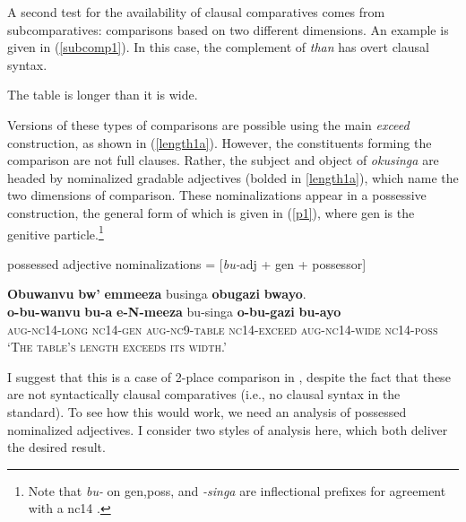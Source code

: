 \documentclass[output=paper,
modfonts
]{langscibook}
\begin{document}
A second test for the availability of clausal comparatives comes from {\sc subcomparatives}: comparisons based on two different dimensions. An  example is given in (\ref{subcomp1}). In this case, the complement of {\it than} has overt clausal syntax.



\begin{exe}
\ex\label{subcomp1} The table is longer than it is wide.
\end{exe}


Versions of these types of comparisons are possible using the  main  {\it exceed} construction, as shown in (\ref{length1a}). However, the constituents forming the comparison are not full clauses. Rather, the subject and object of {\it okusinga} are headed by nominalized gradable adjectives (bolded in \ref{length1a}), which name the two dimensions of comparison. These nominalizations appear in a possessive construction, the general form of which is given in (\ref{p1}), where {\sc gen} is the genitive particle.\footnote{Note that {\it bu-} on {\sc gen},{\sc poss}, and {\it-singa} are inflectional prefixes for agreement with a {\sc nc14} .}




\begin{exe}
\ex\label{p1}
 possessed adjective nominalizations = [{\it bu-}adj + {\sc gen} + possessor]
 
\ex\label{length1a}
 \glll \textbf{Obuwanvu} \textbf{bw'} \textbf{emmeeza} businga  \textbf{obugazi} \textbf{bwayo}.\\
\textbf{o-bu-wanvu} \textbf{bu-a} \textbf{e-N-meeza} bu-singa \textbf{o-bu-gazi} \textbf{bu-ayo} \\
\scshape aug-nc14\rm-long \scshape nc14-gen \scshape aug-nc9\rm-table \scshape nc14\rm-exceed \scshape aug-nc14\rm-wide \scshape nc14-poss \\
\glt `The table's length exceeds its width.'   %
\end{exe}




I suggest that this is a case of  2-place comparison in , despite the fact that these are not syntactically clausal comparatives (i.e., no clausal syntax in the standard). To see how this would work, we need an analysis of possessed nominalized adjectives. I consider two styles of analysis here, which both deliver the desired result.
\end{document}
